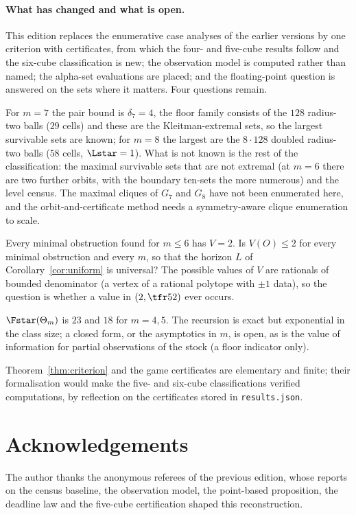 \paragraph{What has changed and what is open.}
This edition replaces the enumerative case analyses of the earlier versions by one criterion with certificates, from which the four- and five-cube results follow and the six-cube classification is new; the observation model is computed rather than named; the alpha-set evaluations are placed; and the floating-point question is answered on the sets where it matters. Four questions remain.
\begin{openproblem}
For $m=7$ the pair bound is $\delta_7=4$, the floor family consists of the $128$ radius-two balls ($29$ cells) and these are the Kleitman-extremal sets, so the largest survivable sets are known; for $m=8$ the largest are the $8\cdot128$ doubled radius-two balls ($58$ cells, $\Lstar=1$). What is not known is the rest of the classification: the maximal survivable sets that are not extremal (at $m=6$ there are two further orbits, with the boundary ten-sets the more numerous) and the level census. The maximal cliques of $G_7$ and $G_8$ have not been enumerated here, and the orbit-and-certificate method needs a symmetry-aware clique enumeration to scale.
\end{openproblem}
\begin{openproblem}
Every minimal obstruction found for $m\le6$ has $V=2$. Is $V(O)\le2$ for every minimal obstruction and every $m$, so that the horizon $L$ of Corollary~\ref{cor:uniform} is universal? The possible values of $V$ are rationals of bounded denominator (a vertex of a rational polytope with $\pm1$ data), so the question is whether a value in $(2,\tfr52)$ ever occurs.
\end{openproblem}
\begin{openproblem}
$\Fstar(\Theta_m)$ is $23$ and $18$ for $m=4,5$. The recursion is exact but exponential in the class size; a closed form, or the asymptotics in $m$, is open, as is the value of information for partial observations of the stock (a floor indicator only).
\end{openproblem}
\begin{openproblem}[formalisation]
Theorem~\ref{thm:criterion} and the game certificates are elementary and finite; their formalisation would make the five- and six-cube classifications verified computations, by reflection on the certificates stored in \texttt{results.json}.
\end{openproblem}

\section*{Acknowledgements}
The author thanks the anonymous referees of the previous edition, whose reports on the census baseline, the observation model, the point-based proposition, the deadline law and the five-cube certification shaped this reconstruction.
